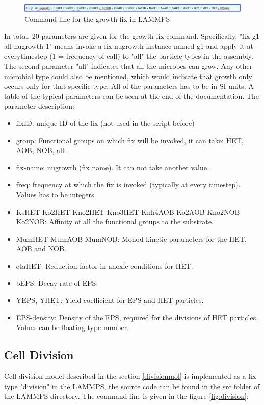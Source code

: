\documentclass[11pt,a4paper,openright]{article}
\begin{document}
\begin{figure}[H]
\begin{center}
  \includegraphics[width=0.98\columnwidth]{Figs/growthfix.pdf}
\caption{Command line for the growth fix in LAMMPS}
\label{fig:growth}       %
\end{center}
\end{figure}
 
In total, 20 parameters are given for the growth fix command. Specifically, "fix g1 all nugrowth 1" means invoke a fix nugrowth instance named g1 and apply it at everytimestep (1 = frequency of call) to "all" the particle types in the assembly. The second parameter "all" indicates that all the microbes can grow. Any other microbial type could also be mentioned, which would indicate that growth only occurs only for that specific type. All of the parameters has to be in SI units. A table of the typical parameters can be seen at the end of the documentation. The parameter description:

\begin{itemize}
\item fixID: unique ID of the fix (not used in the script before)
\item group: Functional groups on which fix will be invoked, it can take: HET, AOB, NOB, all.
\item fix-name: nugrowth (fix name). It can not take another value.
\item freq: frequency at which the fix is invoked (typically at every timestep). Values has to be integers.
\item KsHET Ko2HET Kno2HET Kno3HET Knh4AOB Ko2AOB Kno2NOB Ko2NOB: Affinity of all the functional groups to the substrate.
\item MumHET MumAOB MumNOB: Monod kinetic parameters for the HET, AOB and NOB.
\item etaHET: Reduction factor in anoxic conditions for HET.
\item bEPS: Decay rate of EPS.
\item YEPS, YHET: Yield coefficient for EPS and HET particles.
\item EPS-density: Density of the EPS, required for the divisions of HET particles. Values can be floating type number.
\end{itemize}


\subsection{Cell Division}
Cell division model described in the section \ref{divisionmol} is implemented as a fix type "division" in the LAMMPS, the source code can be found in the src folder of the LAMMPS directory. The command line is given in the figure \ref{fig:division}:
\end{document}
